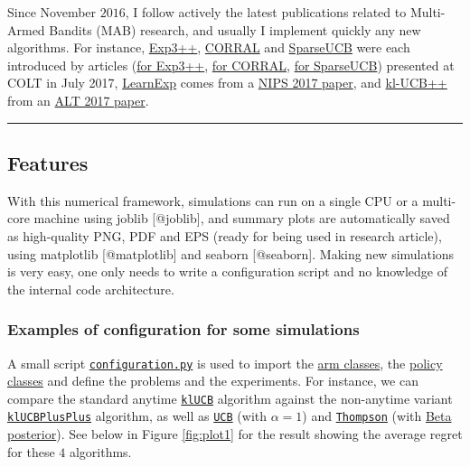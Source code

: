 Since November \(2016\), I follow actively the latest publications
related to Multi-Armed Bandits (MAB) research, and usually I implement
quickly any new algorithms. For instance,
\href{https://smpybandits.github.io/docs/Policies.Exp3PlusPlus.html}{Exp3++},
\href{https://smpybandits.github.io/docs/Policies.CORRAL.html}{CORRAL}
and
\href{https://smpybandits.github.io/docs/Policies.SparseUCB.html}{SparseUCB}
were each introduced by articles
(\href{https://arxiv.org/pdf/1702.06103}{for Exp3++},
\href{https://arxiv.org/abs/1612.06246v2}{for CORRAL},
\href{https://arxiv.org/abs/1706.01383}{for SparseUCB}) presented at
COLT in July 2017,
\href{https://smpybandits.github.io/docs/Policies.LearnExp.html}{LearnExp}
comes from a \href{https://arxiv.org/abs/1702.04825}{NIPS 2017 paper},
and
\href{https://smpybandits.github.io/docs/Policies.klUCBPlusPlus.html}{kl-UCB++}
from an \href{https://hal.inria.fr/hal-01475078}{ALT 2017 paper}.

\begin{center}\rule{0.5\linewidth}{\linethickness}\end{center}

\hypertarget{features}{%
\subsection{Features}\label{features}}

With this numerical framework, simulations can run on a single CPU or a
multi-core machine using joblib {[}@joblib{]}, and summary plots are
automatically saved as high-quality PNG, PDF and EPS (ready for being
used in research article), using matplotlib {[}@matplotlib{]} and
seaborn {[}@seaborn{]}. Making new simulations is very easy, one only
needs to write a configuration script and no knowledge of the internal
code architecture.

\hypertarget{examples-of-configuration-for-some-simulations}{%
\subsubsection{Examples of configuration for some
simulations}\label{examples-of-configuration-for-some-simulations}}

A small script
\href{https://smpybandits.github.io/docs/configuration.html}{\texttt{configuration.py}}
is used to import the
\href{https://smpybandits.github.io/docs/Arms.html}{arm classes}, the
\href{https://smpybandits.github.io/docs/Policies.html}{policy classes}
and define the problems and the experiments. For instance, we can
compare the standard anytime
\href{https://smpybandits.github.io/docs/Policies.klUCB.html}{\texttt{klUCB}}
algorithm against the non-anytime variant
\href{https://smpybandits.github.io/docs/Policies.klUCBPlusPlus.html}{\texttt{klUCBPlusPlus}}
algorithm, as well as
\href{https://smpybandits.github.io/docs/Policies.UCBalpha.html}{\texttt{UCB}}
(with \(\alpha=1\)) and
\href{https://smpybandits.github.io/docs/Policies.Thompson.html}{\texttt{Thompson}}
(with
\href{https://smpybandits.github.io/docs/Policies.Posterior.Beta.html}{Beta
posterior}). See below in Figure \ref{fig:plot1} for the result showing
the average regret for these \(4\) algorithms.

